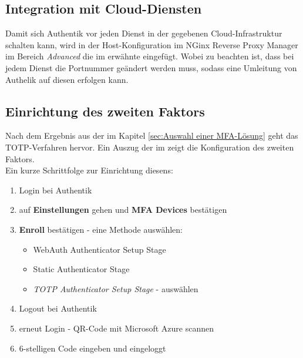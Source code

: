\subsection{Integration mit Cloud-Diensten}
\label{sec:Integration mit Cloud-Diensten}
Damit sich Authentik vor jeden Dienst in der gegebenen Cloud-Infrastruktur schalten kann, wird in der Host-Konfiguration im NGinx Reverse 
Proxy Manager im Bereich \textit{Advanced} die im  erwähnte  eingefügt. Wobei zu beachten ist, 
dass bei jedem Dienst die Portnummer geändert werden muss, sodass eine Umleitung von Authelik auf diesen erfolgen kann.

\subsection{Einrichtung des zweiten Faktors}
\label{sec:Einrichtung des zweiten Faktors}
Nach dem Ergebnis aus der  im Kapitel \ref{sec:Auswahl einer MFA-Lösung}  
geht das \acs{TOTP}-Verfahren hervor. Ein Auszug der  im  zeigt die Konfiguration des 
zweiten Faktors.
\\Ein kurze Schrittfolge zur Einrichtung diesens:
\begin{enumerate}
    \item Login bei Authentik
    \item auf \textbf{Einstellungen} gehen und \textbf{\acs{MFA} Devices} bestätigen
    \item \textbf{Enroll} bestätigen - eine Methode auswählen:
    \begin{itemize}
        \item WebAuth Authenticator Setup Stage
        \item Static Authenticator Stage
        \item \textit{TOTP Authenticator Setup Stage} - auswählen
    \end{itemize}
   \item Logout bei Authentik
   \item erneut Login - QR-Code mit Microsoft Azure scannen
   \item 6-stelligen Code eingeben und eingeloggt
\end{enumerate}